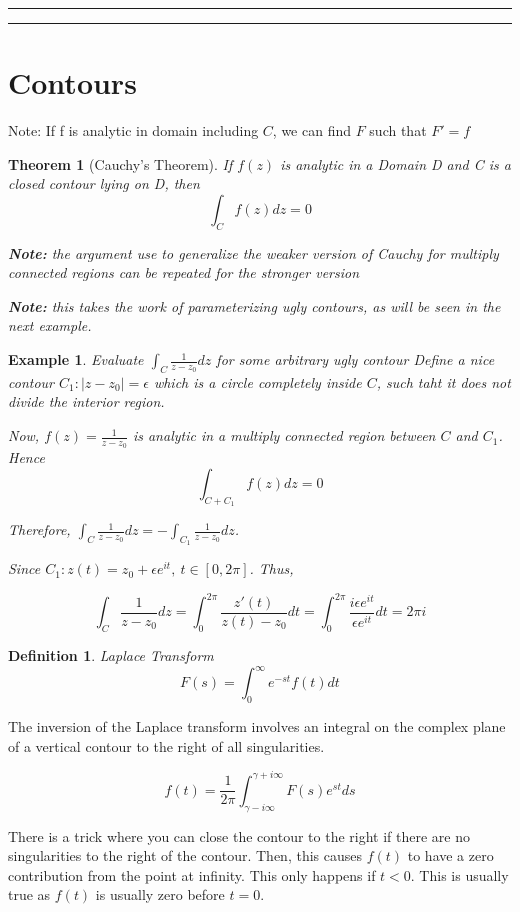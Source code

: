 \documentclass{article}
\newtheorem{theorem}{Theorem}[section]
\newtheorem{ex}{Example}
\theoremstyle{definition}
\newtheorem{definition}{Definition}[section]
\newcommand{\Section}[1]{\hrule\hrule\section{#1}}
\newcommand{\Def}[2]{
\begin{shaded*}
\begin{definition}{\textit{#1}}\\#2\end{definition}
\end{shaded*}
}
\begin{document}
\Section{Contours}

Note: If f is analytic in domain including $C$, we can find $F$ such that $F'=f$

\begin{theorem}[Cauchy's Theorem]
If $f(z)$ is analytic in a Domain D and C is a closed contour lying on D, then $$\int_{C} f(z) dz = 0$$

\textbf{Note:} the argument use to generalize the weaker version of Cauchy for multiply connected regions can be repeated for the stronger version

\textbf{Note:} this takes the work of parameterizing ugly contours, as will be seen in the next example.
\end{theorem}

\begin{ex}
Evaluate $\int_C \frac{1}{z-z_0}dz$ for some arbitrary ugly contour
Define a nice contour $C_1 : |z-z_0| = \epsilon$ which is a circle completely inside $C$, such taht it does not divide the interior region.

Now, $f(z) = \frac{1}{z-z_0}$ is analytic in a multiply connected region between $C$ and $C_1$. Hence
$$\int_{C+C_1}f(z)dz = 0$$

Therefore, $\int_C \frac{1}{z-z_0}dz = -\int_{C_1} \frac{1}{z-z_0}dz$. 

Since $C_1 : z(t) = z_0 + \epsilon e^{it},\ t \in [0, 2\pi]$. Thus, 

$$\int_C \frac{1}{z-z_0}dz = \int_{0}^{2\pi}\frac{z'(t)}{z(t)-z_0} dt = \int_{0}^{2\pi} \frac{i\epsilon e^{it}}{\epsilon e^{it}} dt = 2\pi i$$
\end{ex}

\Def{Laplace Transform}{$$F(s) = \int_{0}^{\infty} e^{-st} f(t) dt$$

The inversion of the Laplace transform involves an integral on the complex plane of a vertical contour to the right of all singularities. 

$$f(t) = \frac{1}{2\pi}\int_{\gamma - i \infty}^{\gamma + i \infty} F(s) e^{st}ds $$

There is a trick where you can close the contour to the right if there are no singularities to the right of the contour. Then, this causes $f(t)$ to have a zero contribution from the point at infinity. This only happens if $t<0$. This is usually true as $f(t)$ is usually zero before $t=0$.}
\end{document}
